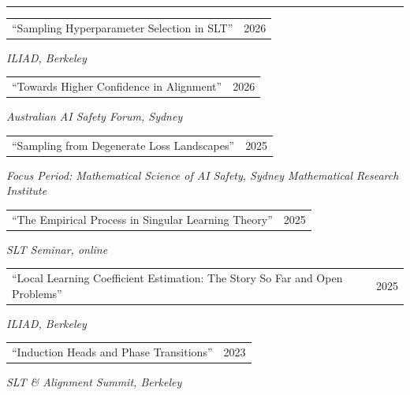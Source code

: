 \documentclass[11pt]{article}
\makeatletter
\newcommand{\resumesection}[1]{\par\needspace{5\baselineskip}\vspace{8pt}{\large\bfseries #1}\par\vspace{3pt}\hrule \vspace{5.5pt}}
\newcommand{\work}[3]{%
  \begin{tabularx}{\linewidth}{@{}>{\raggedright\arraybackslash}X@{\hspace{1.5em}}r@{}}
    ``#1'' & #2 \\
  \end{tabularx}\par
  {\raggedright #3\par}\medskip}
\makeatother
\begin{document}
    \resumesection{Talks}

        \work{Sampling Hyperparameter Selection in SLT}{2026}
        {\textit{ILIAD, Berkeley}}

        \work{Towards Higher Confidence in Alignment}{2026}
        {\textit{Australian AI Safety Forum, Sydney}}

        \work{Sampling from Degenerate Loss Landscapes}{2025}
        {\textit{Focus Period: Mathematical Science of AI Safety, Sydney Mathematical Research Institute}}

        \work{The Empirical Process in Singular Learning Theory}{2025}
        {\textit{SLT Seminar, online}}

        \work{Local Learning Coefficient Estimation: The Story So Far and Open Problems}{2025}
        {\textit{ILIAD, Berkeley}}

        \work{Induction Heads and Phase Transitions}{2023}
        {\textit{SLT \& Alignment Summit, Berkeley}}
\end{document}
